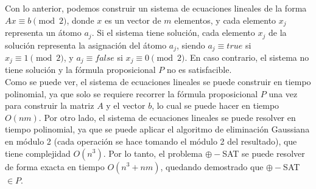 \documentclass[letterpaper, 12pt]{article}
\begin{document}
\begin{enumerate}
Con lo anterior, podemos construir un sistema de ecuaciones lineales de la forma $Ax \equiv b \pmod{2}$, donde $x$ es un vector de $m$ elementos, y cada elemento $x_j$ representa un átomo $a_j$. Si el sistema tiene solución, cada elemento $x_j$ de la solución representa la asignación del átomo $a_j$, siendo $a_j \equiv true$ si $x_j \equiv 1 \pmod{2}$, y $a_j \equiv false$ si $x_j \equiv 0 \pmod{2}$. En caso contrario, el sistema no tiene solución y la fórmula proposicional $P$ no es satisfacible. \\

Como se puede ver, el sistema de ecuaciones lineales se puede construir en tiempo polinomial, ya que solo se requiere recorrer la fórmula proposicional $P$ una vez para construir la matriz $A$ y el vector $b$, lo cual se puede hacer en tiempo $O(nm)$. Por otro lado, el sistema de ecuaciones lineales se puede resolver en tiempo polinomial, ya que se puede aplicar el algoritmo de eliminación Gaussiana en módulo 2 (cada operación se hace tomando el módulo 2 del resultado), que tiene complejidad $O(n^3)$. Por lo tanto, el problema $\oplus-$SAT se puede resolver de forma exacta en tiempo $O(n^3 + nm)$, quedando demostrado que $\oplus-$SAT $\in P$. \\

\end{enumerate} \vspace{4mm}
\end{document}
